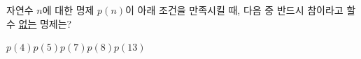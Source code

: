 \hspace*{2mm}\begin{minipage}[t]{\dimexpr\linewidth-2mm\relax}\vspace{0pt}
자연수 $n$에 대한 명제 $p(n)$이 아래 조건을 만족시킬 때, 다음 중 반드시 참이라고 할 수 \underline{없는} 명제는? 
\begin{choices32}{$p(4)$}{$p(5)$}{$p(7)$}{$p(8)$}{$p(13)$}\end{choices32}\end{minipage}
